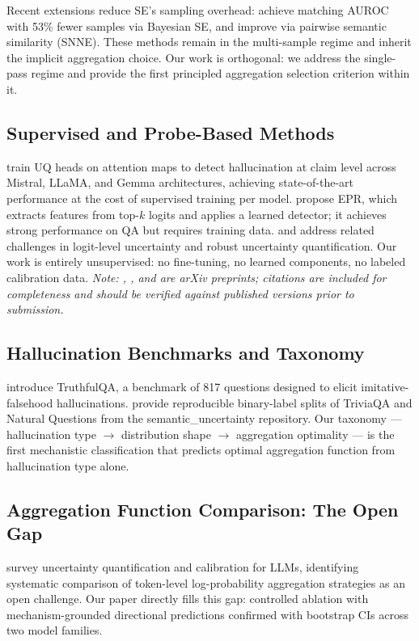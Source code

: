 Recent extensions reduce SE's sampling overhead: \citet{ciosek2025} achieve matching AUROC with 53\% fewer samples via Bayesian SE, and \citet{nguyen2025} improve via pairwise semantic similarity (SNNE). These methods remain in the multi-sample regime and inherit the implicit aggregation choice. Our work is orthogonal: we address the single-pass regime and provide the first principled aggregation selection criterion within it.

\subsection{Supervised and Probe-Based Methods}

\citet{shelmanov2025} train UQ heads on attention maps to detect hallucination at claim level across Mistral, LLaMA, and Gemma architectures, achieving state-of-the-art performance at the cost of supervised training per model. \citet{moslonka2025} propose EPR, which extracts features from top-$k$ logits and applies a learned detector; it achieves strong performance on QA but requires training data. \citet{ma2025} and \citet{zhang2025} address related challenges in logit-level uncertainty and robust uncertainty quantification. Our work is entirely unsupervised: no fine-tuning, no learned components, no labeled calibration data. \textit{Note: \citet{ma2025}, \citet{moslonka2025}, and \citet{zhang2025} are arXiv preprints; citations are included for completeness and should be verified against published versions prior to submission.}

\subsection{Hallucination Benchmarks and Taxonomy}

\citet{lin2022} introduce TruthfulQA, a benchmark of 817 questions designed to elicit imitative-falsehood hallucinations. \citet{farquhar2024} provide reproducible binary-label splits of TriviaQA and Natural Questions from the semantic\_uncertainty repository. Our taxonomy --- hallucination type $\to$ distribution shape $\to$ aggregation optimality --- is the first mechanistic classification that predicts optimal aggregation function from hallucination type alone.

\subsection{Aggregation Function Comparison: The Open Gap}

\citet{liu2025} survey uncertainty quantification and calibration for LLMs, identifying systematic comparison of token-level log-probability aggregation strategies as an open challenge. Our paper directly fills this gap: controlled ablation with mechanism-grounded directional predictions confirmed with bootstrap CIs across two model families.
